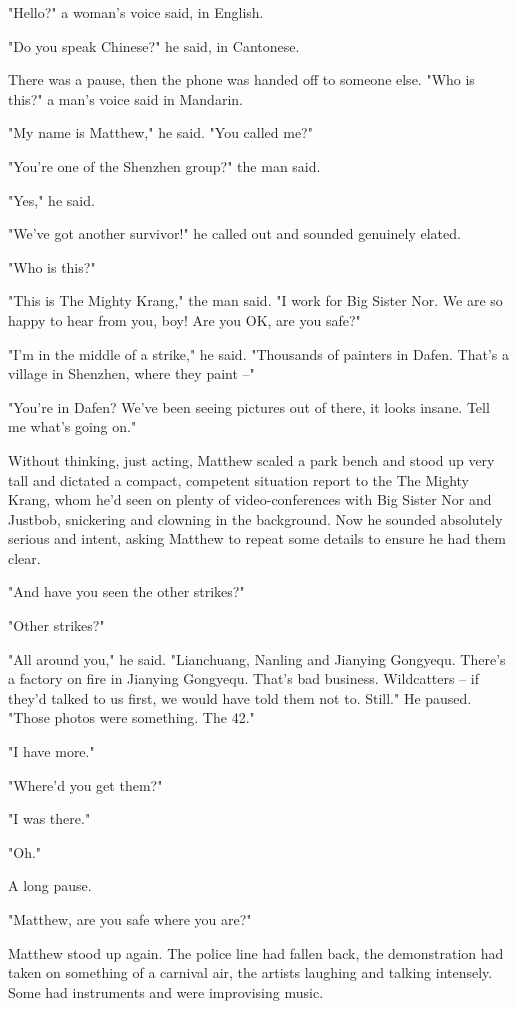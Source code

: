 "Hello?" a woman's voice said, in English.

"Do you speak Chinese?" he said, in Cantonese.

There was a pause, then the phone was handed off to someone else.
"Who is this?" a man's voice said in Mandarin.

"My name is Matthew," he said. "You called me?"

"You're one of the Shenzhen group?" the man said.

"Yes," he said.

"We've got another survivor!" he called out and sounded genuinely
elated.

"Who is this?"

"This is The Mighty Krang," the man said. "I work for Big Sister
Nor. We are so happy to hear from you, boy! Are you OK, are you
safe?"

"I'm in the middle of a strike," he said. "Thousands of painters in
Dafen. That's a village in Shenzhen, where they paint --"

"You're in Dafen? We've been seeing pictures out of there, it looks
insane. Tell me what's going on."

Without thinking, just acting, Matthew scaled a park bench and
stood up very tall and dictated a compact, competent situation
report to the The Mighty Krang, whom he'd seen on plenty of
video-conferences with Big Sister Nor and Justbob, snickering and
clowning in the background. Now he sounded absolutely serious and
intent, asking Matthew to repeat some details to ensure he had them
clear.

"And have you seen the other strikes?"

"Other strikes?"

"All around you," he said. "Lianchuang, Nanling and Jianying
Gongyequ. There's a factory on fire in Jianying Gongyequ. That's
bad business. Wildcatters -- if they'd talked to us first, we would
have told them not to. Still." He paused. "Those photos were
something. The 42."

"I have more."

"Where'd you get them?"

"I was there."

"Oh."

A long pause.

"Matthew, are you safe where you are?"

Matthew stood up again. The police line had fallen back, the
demonstration had taken on something of a carnival air, the artists
laughing and talking intensely. Some had instruments and were
improvising music.

